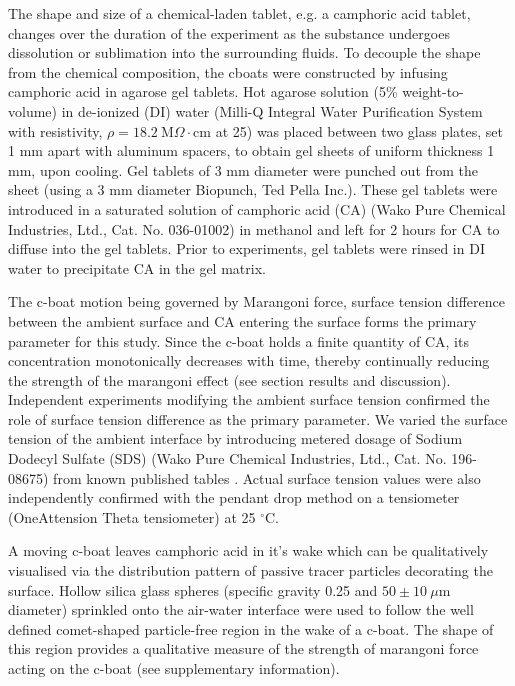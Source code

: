 \documentclass[journal=langd5, manuscript=article, layout=twocolumn]{achemso}
\begin{document}
The shape and size of a chemical-laden tablet, e.g. a camphoric acid tablet, changes over the duration of the experiment as the substance undergoes dissolution or sublimation into the surrounding fluids. 
To decouple the shape from the chemical composition, the cboats were constructed by infusing camphoric acid in agarose gel tablets. Hot agarose solution (5\% weight-to-volume) in de-ionized (DI) water (Milli-Q Integral Water Purification System with resistivity, $\rho=18.2\ \mathrm{M}\Omega\cdot\mathrm{cm}$ at 25\celsius) was placed between two glass plates, set 1 mm apart with aluminum spacers, to obtain gel sheets of uniform thickness 1 mm, upon cooling. Gel tablets of 3 mm diameter were punched out from the sheet (using a 3 mm diameter Biopunch, Ted Pella Inc.). These gel tablets were introduced in a saturated solution of camphoric acid (CA) (Wako Pure Chemical Industries, Ltd., Cat. No. 036-01002) in methanol and left for 2 hours for CA to diffuse into the gel tablets. Prior to experiments, gel tablets were rinsed in DI water to precipitate CA in the gel matrix. 

The c-boat motion being governed by Marangoni force, surface tension difference between the ambient surface and CA entering the surface forms the primary parameter for this study. Since the c-boat holds a finite quantity of CA, its concentration monotonically decreases with time, thereby continually reducing the strength of the marangoni effect (see section results and discussion). Independent experiments modifying the ambient surface tension confirmed the role of surface tension difference as the primary parameter. We varied the surface tension of the ambient interface by introducing metered dosage of Sodium Dodecyl Sulfate (SDS) (Wako Pure Chemical Industries, Ltd., Cat. No. 196-08675) from known published tables \cite{mysels1986}. Actual surface tension values were also independently confirmed with the pendant drop method on a tensiometer (OneAttension Theta tensiometer) at 25 $^{\circ}$C.

A moving c-boat leaves camphoric acid in it's wake which can be qualitatively visualised via the distribution pattern of passive tracer particles decorating the surface. Hollow silica glass spheres (specific gravity 0.25 and $50 \pm 10~\mu$m diameter) sprinkled onto the air-water interface were used to follow the well defined comet-shaped particle-free region in the wake of a c-boat. The shape of this region provides a qualitative measure of the strength of marangoni force acting on the c-boat (see supplementary information).
\end{document}
